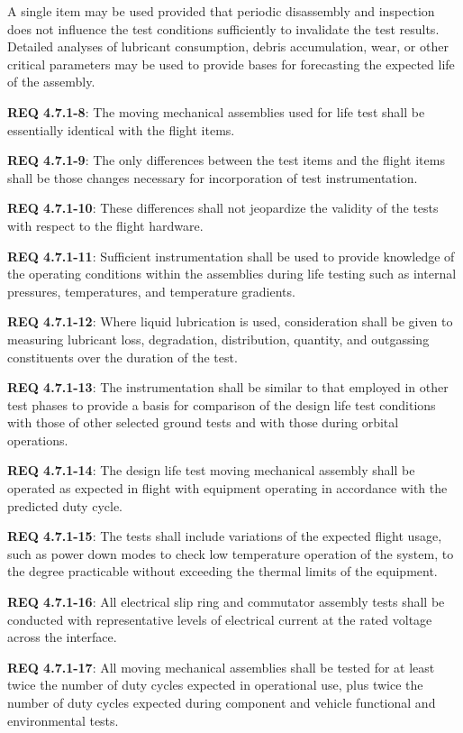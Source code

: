 \documentclass[12pt]{article}
\begin{document}
A single item may be used provided that periodic disassembly and inspection does not influence the test conditions sufficiently to invalidate the test results.
Detailed analyses of lubricant consumption, debris accumulation, wear, or other critical parameters may be used to provide bases for forecasting the expected life of the assembly. 

\noindent \textbf{REQ 4.7.1-8}: The moving mechanical assemblies used for life test shall be essentially identical with the flight items. 

\noindent \textbf{REQ 4.7.1-9}: The only differences between the test items and the flight items shall be those changes necessary for incorporation of test instrumentation. 

\noindent \textbf{REQ 4.7.1-10}: These differences shall not jeopardize the validity of the tests with respect to the flight hardware. 

\noindent \textbf{REQ 4.7.1-11}: Sufficient instrumentation shall be used to provide knowledge of the operating conditions within the assemblies during life testing such as internal pressures, temperatures, and temperature gradients. 

\noindent \textbf{REQ 4.7.1-12}: Where liquid lubrication is used, consideration shall be given to measuring lubricant loss, degradation, distribution, quantity, and outgassing constituents over the duration of the test. 

\noindent \textbf{REQ 4.7.1-13}: The instrumentation shall be similar to that employed in other test phases to provide a basis for comparison of the design life test conditions with those of other selected ground tests and with those during orbital operations. 

\noindent \textbf{REQ 4.7.1-14}: The design life test moving mechanical assembly shall be operated as expected in flight with equipment operating in accordance with the predicted duty cycle.

\noindent \textbf{REQ 4.7.1-15}: The tests shall include variations of the expected flight usage, such as power down modes to check low temperature operation of the system, to the degree practicable without exceeding the thermal limits of the equipment. 

\noindent \textbf{REQ 4.7.1-16}: All electrical slip ring and commutator assembly tests shall be conducted with representative levels of electrical current at the rated voltage across the interface. 

\noindent \textbf{REQ 4.7.1-17}: All moving mechanical assemblies shall be tested for at least twice the number of duty cycles expected in operational use, plus twice the number of duty cycles expected during component and vehicle functional and environmental tests. 
\end{document}
